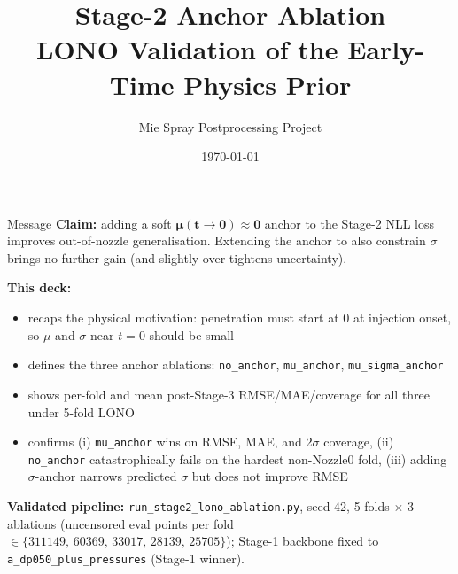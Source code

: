 \documentclass[UTF8,aspectratio=169]{ctexbeamer}
\title[Stage-2 Anchor Ablation]{Stage-2 Anchor Ablation\\LONO Validation of the Early-Time Physics Prior}
\author{Mie Spray Postprocessing Project}
\date{\today}
\begin{document}
\begin{frame}
  \titlepage
\end{frame}

\begin{frame}{Message}
\small
\textbf{Claim:} adding a soft $\bm{\mu(t{\to}0){\approx}0}$ anchor to the Stage-2 NLL loss
improves out-of-nozzle generalisation. Extending the anchor to also constrain $\sigma$
brings no further gain (and slightly over-tightens uncertainty).

\vspace{0.5em}
\textbf{This deck:}
\begin{itemize}
  \item recaps the physical motivation: penetration must start at $0$ at injection onset,
        so $\mu$ and $\sigma$ near $t{=}0$ should be small
  \item defines the three anchor ablations: \texttt{no\_anchor}, \texttt{mu\_anchor},
        \texttt{mu\_sigma\_anchor}
  \item shows per-fold and mean post-Stage-3 RMSE/MAE/coverage for all three under 5-fold LONO
  \item confirms (i) \texttt{mu\_anchor} wins on RMSE, MAE, and 2$\sigma$ coverage,
        (ii) \texttt{no\_anchor} catastrophically fails on the hardest non-Nozzle0 fold,
        (iii) adding $\sigma$-anchor narrows predicted $\sigma$ but does not improve RMSE
\end{itemize}

\vspace{0.5em}
\textbf{Validated pipeline:} \texttt{run\_stage2\_lono\_ablation.py}, seed 42, 5 folds $\times$ 3 ablations
(uncensored eval points per fold $\in\{311149,\,60369,\,33017,\,28139,\,25705\}$);
Stage-1 backbone fixed to \texttt{a\_dp050\_plus\_pressures} (Stage-1 winner).
\end{frame}
\end{document}
